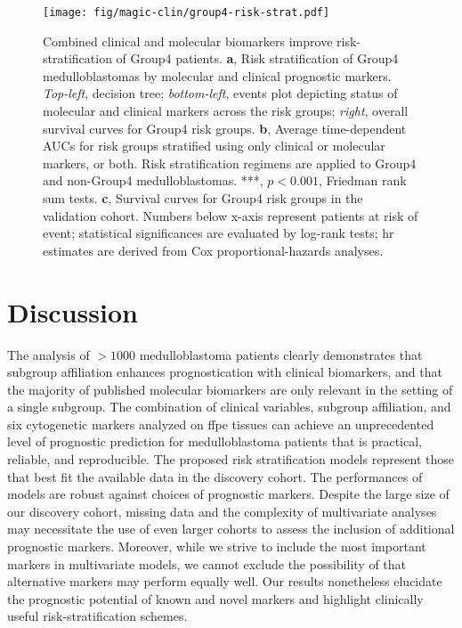 \clearpage

\begin{figure}[h]
	\begin{center}
		\texttt{[image: fig/magic-clin/group4-risk-strat.pdf]}
	\end{center}
	\caption[Combined clinical and molecular biomarkers improve risk-stratification of Group4 patients]
	{Combined clinical and molecular biomarkers improve risk-stratification of Group4 patients.
	\textbf{a}, Risk stratification of Group4 medulloblastomas by molecular and clinical prognostic markers. \emph{Top-left}, decision tree; \emph{bottom-left}, events plot depicting status of molecular and clinical markers across the risk groups; \emph{right}, overall survival curves for Group4 risk groups.
	\textbf{b}, Average time-dependent AUCs for risk groups stratified using only clinical or molecular markers, or both. Risk stratification regimens are applied to Group4 and non-Group4 medulloblastomas. ***, $p < 0.001$, Friedman rank sum tests.
	\textbf{c}, Survival curves for Group4 risk groups in the validation cohort. 
	Numbers below x-axis represent patients at risk of event; statistical significances are evaluated by log-rank tests; \gls{hr} estimates are derived from Cox proportional-hazards analyses.
	}
	\label{fig:group4-risk-strat}
\end{figure}

\clearpage


\section{Discussion}

The analysis of $> 1000$ medulloblastoma patients clearly demonstrates that subgroup affiliation enhances prognostication with clinical biomarkers, and that the majority of published molecular biomarkers are only relevant in the setting of a single subgroup. The combination of clinical variables, subgroup affiliation, and six cytogenetic markers analyzed on \gls{ffpe} tissues can achieve an unprecedented level of prognostic prediction for medulloblastoma patients that is practical, reliable, and reproducible. The proposed risk stratification models represent those that best fit the available data in the discovery cohort. The performances of models are robust against choices of prognostic markers. Despite the large size of our discovery cohort, missing data and the complexity of multivariate analyses may necessitate the use of even larger cohorts to assess the inclusion of additional prognostic markers. Moreover, while we strive to include the most important markers in multivariate models, we cannot exclude the possibility of that alternative markers may perform equally well. Our results nonetheless elucidate the prognostic potential of known and novel markers and highlight clinically useful risk-stratification schemes.

